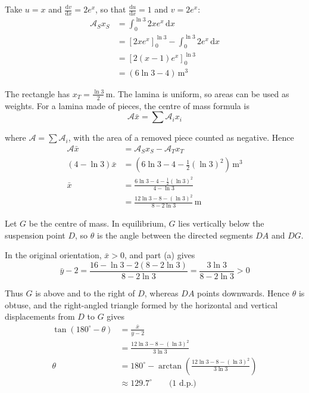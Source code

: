 \documentclass[leqno]{article}
\begin{document}
\begin{enumerate}[
  label=\textbf{\arabic*.},
  leftmargin=*,
  topsep=0pt,
  partopsep=0pt,
  parsep=0pt
]
\begin{djsSolution}
\begin{enumerate}[label=\textbf{(\alph*)}, start=1]
Take \(u=x\) and \(\frac{\mathrm{d}v}{\mathrm{d}x}=2e^x\), so that \(\frac{\mathrm{d}u}{\mathrm{d}x}=1\) and \(v=2e^x\):
\begin{align*}
\mathcal{A}_Sx_S
&=\int_0^{\ln3}2xe^x\,\mathrm{d}x\\
&=\left[2xe^x\right]_0^{\ln3}-\int_0^{\ln3}2e^x\,\mathrm{d}x\\
&=\left[2(x-1)e^x\right]_0^{\ln3}\\
&=(6\ln3-4)\,\mathrm{m^3}
\end{align*}

The rectangle has \(x_T=\frac{\ln3}{2}\,\mathrm{m}\). The lamina is uniform, so areas can be used as weights. For a lamina made of pieces, the centre of mass formula is
\[
\mathcal{A}\bar{x}=\sum\mathcal{A}_ix_i
\]

where \(\mathcal{A}=\sum\mathcal{A}_i\), with the area of a removed piece counted as negative. Hence
\begin{align*}
\mathcal{A}\bar{x}&=\mathcal{A}_Sx_S-\mathcal{A}_Tx_T\\
(4-\ln3)\bar{x}&=\left(6\ln3-4-\frac12(\ln3)^2\right)\,\mathrm{m^3}\\
\bar{x}&=\frac{6\ln3-4-\frac12(\ln3)^2}{4-\ln3}\\
&=\frac{12\ln3-8-(\ln3)^2}{8-2\ln3}\,\mathrm{m}
\end{align*}

Let \(G\) be the centre of mass. In equilibrium, \(G\) lies vertically below the suspension point \(D\), so \(\theta\) is the angle between the directed segments \(DA\) and \(DG\).

In the original orientation, \(\bar{x}>0\), and part (a) gives
\[
\bar{y}-2
=\frac{16-\ln3-2(8-2\ln3)}{8-2\ln3}
=\frac{3\ln3}{8-2\ln3}>0
\]

Thus \(G\) is above and to the right of \(D\), whereas \(DA\) points downwards. Hence \(\theta\) is obtuse, and the right-angled triangle formed by the horizontal and vertical displacements from \(D\) to \(G\) gives
\begin{align*}
\tan(180^\circ-\theta)
&=\frac{\bar{x}}{\bar{y}-2}\\
&=\frac{12\ln3-8-(\ln3)^2}{3\ln3}\\
\theta
&=180^\circ-\arctan\left(\frac{12\ln3-8-(\ln3)^2}{3\ln3}\right)\\
&\approx129.7^\circ\qquad\text{(1 d.p.)}
\end{align*}

\end{enumerate}
\end{djsSolution}


\end{enumerate}
\end{document}
